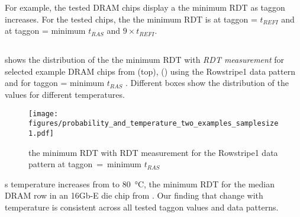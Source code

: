 
For example, the tested   DRAM
chips display a  
the minimum RDT as \gls{taggon} increases.
For the tested  chips, the
  the minimum RDT
 is  at \gls{taggon} =
$t_{REFI}$ and  at \gls{taggon} = minimum $t_{RAS}$ and
$9\times{}t_{REFI}$.

\subsection{}

 shows the distribution of the  the minimum RDT with \emph{ RDT measurement}
for  selected example DRAM chips\gra{,} 
from  (top), 
 () using the Rowstripe1 data pattern and for \gls{taggon} =
minimum $t_{RAS}$ . Different boxes show the distribution of
the  values for different temperatures.

\begin{figure}[!ht]
    \centering
    \texttt{[image: figures/probability\_and\_temperature\_two\_examples\_samplesize1.pdf]}
    \caption{ the minimum RDT with
     RDT measurement for the Rowstripe1 data pattern at
    \gls{taggon}~=~minimum $t_{RAS}$}
    \label{fig:rdt_temperature}
\end{figure}


s temperature increases from  to
\SI{80}{\celsius}, the  minimum RDT for the
median DRAM row 
in an  16Gb-E die chip  from
 . Our finding that
\phenomenon{}  change with temperature is
consistent across all tested \gls{taggon} values and data patterns.

